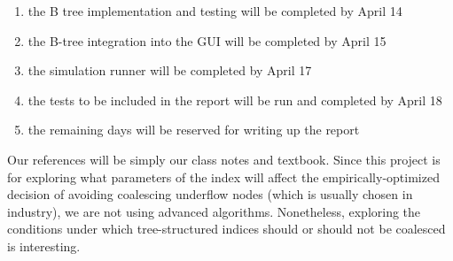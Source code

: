 \documentclass[fleqn]{article}
\begin{document}
\begin{enumerate}

	\item
	the B tree implementation and testing will be completed by April 14
	\item
	the B-tree integration into the GUI will be completed by April 15
	\item
	the simulation runner will be completed by April 17
	\item
	the tests to be included in the report will be run and completed by April 18
	\item
	the remaining days will be reserved for writing up the report
	
\end{enumerate}
Our references will be simply our class notes and textbook. Since this project is for exploring what parameters of the index will affect the empirically-optimized decision of avoiding coalescing underflow nodes (which is usually chosen in industry), we are not using advanced algorithms.  Nonetheless, exploring the conditions under which tree-structured indices should or should not be coalesced is interesting.
\end{document}

